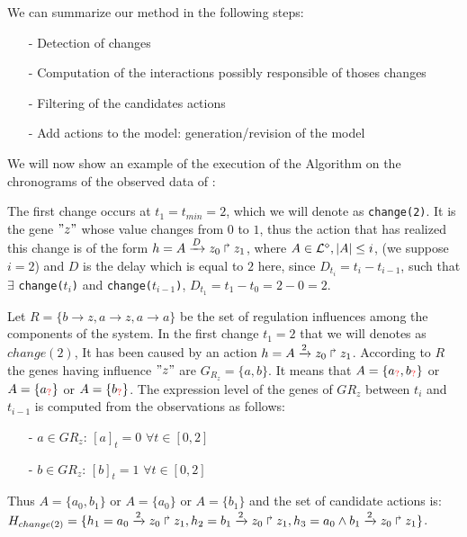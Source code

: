We can summarize our method in the following steps:
\begin{itemize}
\item[-] Detection of changes
\item[-] Computation of the interactions possibly responsible of thoses changes
\item[-] Filtering of the candidates actions
\item[-] Add actions to the model: generation/revision of the model
\end{itemize}


We will now show an example of the execution of the Algorithm  on the chronograms of the observed data of :


The first change occurs at $t_1 = t_{min} = 2$,
which we will denote as \texttt{change(2)}. It is the gene $"z"$ whose value changes from $0$ to $1$, thus the action that has realized this change is of the form $h = A\xrightarrow{D} z_0 \Rsh z_1$,
where $ A \in \mathcal{L}^{\diamond}, | A| \leq i$, (we suppose $i=2$) and $D$ is the delay which is equal to $2$ here, since
$D_{t_i}=t_i - t_{i-1}$, such that $\exists$ \texttt{change($t_i$)} and \texttt{change($t_{i-1}$)},
$D_{t_1}= t_1 - t_0 = 2 - 0 = 2$.

Let $R=\{ b \rightarrow z, a \rightarrow z, a \rightarrow a \}$
be the set of regulation influences among the components of the system.
%
In the first change $t_1 = 2$ that we will denotes as $change(2)$,
It has been caused by an action $h = A\xrightarrow{2} z_0 \Rsh z_1$. According to $R$ the genes having influence $"z"$ are $G_{R_z} = \{a, b\}$. It means that $A= \{ a_{\textcolor{red}{?}}, b_{\textcolor{red}{?}} \} $ or $A= \{ a_{\textcolor{red}{?}} \} $ or $A= \{ b_{\textcolor{red}{?}} \} $.
%
The expression level of the genes of $G{R_z}$ between $t_i$ and $t_{i-1}$ is computed from the observations as follows:
\begin{itemize}
\item[-] $a \in  G{R_z}$: $[a]_t=0$ $\forall t \in [0,2] $
\item[-] $b \in  G{R_z}$: $[b]_t=1$ $\forall t \in [0,2] $
\end{itemize}
%
Thus $A= \{ a_0, b_1 \} $ or $A= \{ a_0\} $ or $A= \{ b_1 \} $ and the set of candidate actions is:
$H_{change(2)} = \{ h_1=a_0\xrightarrow{2} z_0 \Rsh z_1
, h_2=b_1\xrightarrow{2} z_0 \Rsh z_1
, h_3=a_0 \wedge b_1 \xrightarrow{2} z_0 \Rsh z_1 \}$.

